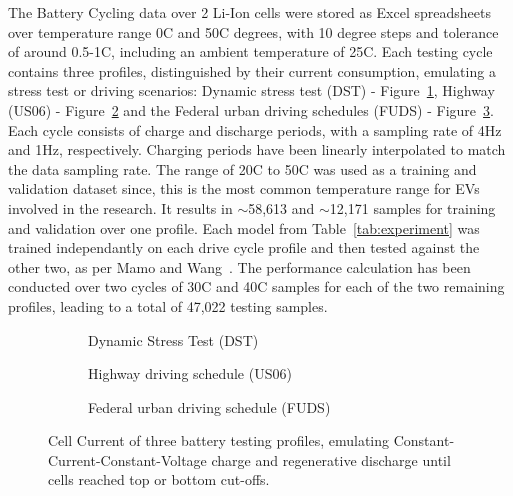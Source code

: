 %
The Battery Cycling data over 2 Li-Ion cells were stored as Excel spreadsheets over temperature range 0\textdegree{}C and 50\textdegree{}C degrees, with 10 degree steps and tolerance of around 0.5-1\textdegree{}C, including an ambient temperature of 25\textdegree{}C.
Each testing cycle contains three profiles, distinguished by their current consumption, emulating a stress test or driving scenarios: Dynamic stress test (DST) - Figure~\ref{subfig:profs-DST}, Highway (US06) - Figure~\ref{subfig:profs-US} and the Federal urban driving schedules (FUDS) - Figure~\ref{subfig:profs-FUDS}.
Each cycle consists of charge and discharge periods, with a sampling rate of 4Hz and 1Hz, respectively.
Charging periods have been linearly interpolated to match the data sampling rate.
The range of 20\textdegree{}C to 50\textdegree{}C was used as a training and validation dataset since, this is the most common temperature range for EVs involved in the research.
It results in $\sim$58,613 and $\sim$12,171 samples for training and validation over one profile.
Each model from \mbox{Table~\ref{tab:experiment}} was trained independantly on each drive cycle profile and then tested against the other two, as per Mamo and Wang~\cite{mamo_long_2020}.
The performance calculation has been conducted over two cycles of 30\textdegree{}C and 40\textdegree{}C samples for each of the two remaining profiles, leading to a total of 47,022 testing samples.
\begin{figure*}[htbp]
    \centering
    \begin{subfigure}[b]{0.28\textheight}
        \centering
        
        \caption{Dynamic Stress Test (DST)}
        \label{subfig:profs-DST}
    \end{subfigure}
    \hfill
    \begin{subfigure}[b]{0.28\textheight}
        \centering
        
        \caption{Highway driving schedule (US06)}
        \label{subfig:profs-US}
    \end{subfigure}
    \hfill
    \begin{subfigure}[b]{0.28\textheight}
        \centering
        
        \caption{Federal urban driving schedule (FUDS)}
        \label{subfig:profs-FUDS}
    \end{subfigure}
    \caption{Cell Current of three battery testing profiles, emulating Constant-Current-Constant-Voltage charge and regenerative discharge until cells reached top or bottom cut-offs.}
    \label{fig:current-profs}
\end{figure*}

